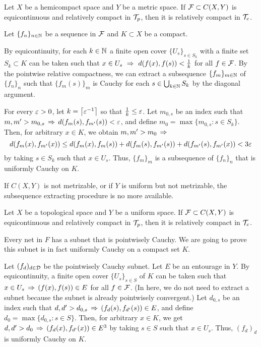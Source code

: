\documentclass{../exp}
\begin{document}
\begin{thm}
Let $X$ be a hemicompact space and $Y$ be a metric space.
If $\mathcal{F}\subset C(X,Y)$ is equicontinuous and relatively compact in $\mathcal{T}_p$, then it is relatively compact in $\mathcal{T}_c$.
\end{thm}
\begin{pf}
Let $\{f_n\}_{n\in\mathbb{N}}$ be a sequence in $\mathcal{F}$ and $K\subset X$ be a compact.

By equicontinuity, for each $k\in\mathbb{N}$ a finite open cover $\{U_s\}_{s\in S_k}$ with a finite set $S_k\subset K$ can be taken such that $x\in U_s\,\,\Rightarrow\,\,d(f(x),f(s))<\frac1k$ for all $f\in\mathcal{F}$.
By the pointwise relative compactness, we can extract a subsequence $\{f_m\}_{m\in\mathbb{N}}$ of $\{f_n\}_n$ such that $\{f_m(s)\}_m$ is Cauchy for each $s\in\bigcup_{k\in\mathbb{N}}S_k$ by the diagonal argument.

For every $\varepsilon>0$, let $k=\left\lceil\varepsilon^{-1}\right\rceil$ so that $\frac1k\le\varepsilon$.
Let $m_{0,s}$ be an index such that $m,m'>m_{0,s}\,\Rightarrow\, d(f_m(s),f_{m'}(s))<\varepsilon$, and define $m_0=\max\{m_{0,s}:s\in S_k\}$.
Then, for arbitrary $x\in K$, we obtain $m,m'>m_0\,\Rightarrow\,$
\[d(f_m(x),f_{m'}(x))\le d(f_m(x),f_m(s))+d(f_m(s),f_{m'}(s))+d(f_{m'}(s),f_{m'}(x))<3\varepsilon\]
by taking $s\in S_k$ such that $x\in U_s$.
Thus, $\{f_m\}_m$ is a subsequence of $\{f_n\}_n$ that is uniformly Cauchy on $K$.
\end{pf}

If $C(X,Y)$ is not metrizable, or if $Y$ is uniform but not metrizable, the subsequence extracting procedure is no more available.

\begin{thm}
Let $X$ be a topological space and $Y$ be a uniform space.
If $\mathcal{F}\subset C(X,Y)$ is equicontinuous and relatively compact in $\mathcal{T}_p$, then it is relatively compact in $\mathcal{T}_c$.
\end{thm}
\begin{pf}[1]
Every net in $F$ has a subnet that is pointwisely Cauchy.
We are going to prove this subnet is in fact uniformly Cauchy on a compact set $K$.

Let $(f_d)_{d\in\mathcal{D}}$ be the pointwisely Cauchy subnet.
Let $E$ be an entourage in $Y$.
By equicontinuity, a finite open cover $\{U_s\}_{s\in S}$ of $K$ can be taken such that $x\in U_s\,\Rightarrow\,(f(x),f(s))\in E$ for all $f\in\mathcal{F}$.
(In here, we do not need to extract a subnet because the subnet is already pointwisely convergent.)
Let $d_{0,s}$ be an index such that $d,d'>d_{0,s}\,\Rightarrow\,(f_d(s),f_{d'}(s))\in E$, and define $d_0=\max\{d_{0,s}:s\in S\}$.
Then, for arbitrary $x\in K$, we get $d,d'>d_0\,\Rightarrow\,(f_d(x),f_{d'}(x))\in E^3$ by taking $s\in S$ such that $x\in U_s$.
Thus, $(f_d)_d$ is uniformly Cauchy on $K$.
\end{pf}
\end{document}
